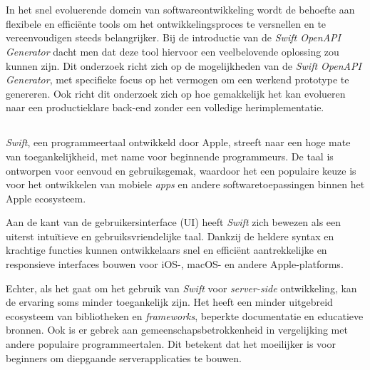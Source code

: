 
\chapter{}%
\label{ch:inleiding}

In het snel evoluerende domein van softwareontwikkeling wordt de behoefte aan flexibele en efficiënte tools om het ontwikkelingsproces te versnellen en te vereenvoudigen steeds belangrijker. Bij de introductie van de  \textit{Swift OpenAPI Generator} dacht men dat deze tool hiervoor een veelbelovende oplossing zou kunnen zijn. Dit onderzoek richt zich op de mogelijkheden van de  \textit{Swift OpenAPI Generator}, met specifieke focus op het vermogen om een werkend prototype te genereren. Ook richt dit onderzoek zich op hoe gemakkelijk het kan evolueren naar een productieklare back-end zonder een volledige herimplementatie.
\newpage


\section{}%
\label{sec:probleemstelling}

\textit{Swift}, een programmeertaal ontwikkeld door Apple, streeft naar een hoge mate van toegankelijkheid, met name voor beginnende programmeurs. De taal is ontworpen voor eenvoud en gebruiksgemak, waardoor het een populaire keuze is voor het ontwikkelen van mobiele  \textit{apps} en andere softwaretoepassingen binnen het Apple ecosysteem.

Aan de kant van de gebruikersinterface (UI) heeft \textit{Swift} zich bewezen als een uiterst intuïtieve en gebruiksvriendelijke taal. Dankzij de heldere syntax en krachtige functies kunnen ontwikkelaars snel en efficiënt aantrekkelijke en responsieve interfaces bouwen voor iOS-, macOS- en andere Apple-platforms. 

Echter, als het gaat om het gebruik van \textit{Swift} voor \textit{server-side} ontwikkeling, kan de ervaring soms minder toegankelijk zijn. Het heeft een minder uitgebreid ecosysteem van bibliotheken en \textit{frameworks}, beperkte documentatie en educatieve bronnen. Ook is er gebrek aan gemeenschapsbetrokkenheid in vergelijking met andere populaire programmeertalen. Dit betekent dat het moeilijker is voor beginners om diepgaande serverapplicaties te bouwen.

